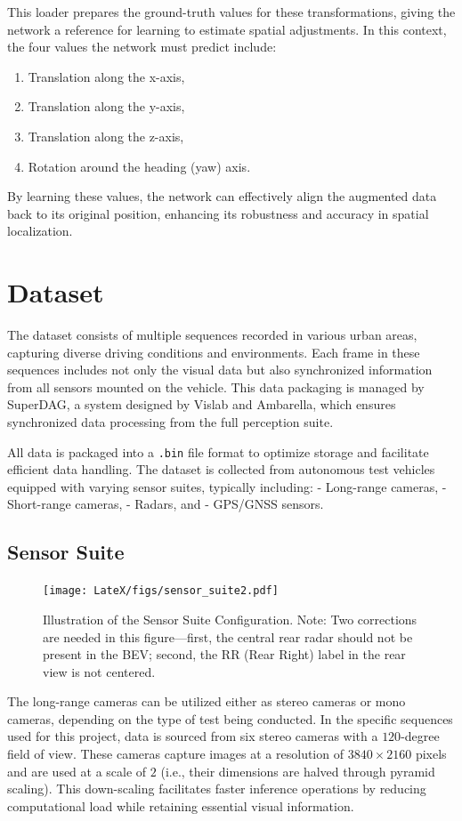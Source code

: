 This loader prepares the ground-truth values for these transformations, giving the network a reference for learning to estimate spatial adjustments. In this context, the four values the network must predict include:
\begin{enumerate}
    \item Translation along the x-axis,
    \item Translation along the y-axis,
    \item Translation along the z-axis, 
    \item Rotation around the heading (yaw) axis.
\end{enumerate}
By learning these values, the network can effectively align the augmented data back to its original position, enhancing its robustness and accuracy in spatial localization.

\section{Dataset}
The dataset consists of multiple sequences recorded in various urban areas, capturing diverse driving conditions and environments. Each frame in these sequences includes not only the visual data but also synchronized information from all sensors mounted on the vehicle. This data packaging is managed by SuperDAG, a system designed by Vislab and Ambarella, which ensures synchronized data processing from the full perception suite.

All data is packaged into a \texttt{.bin} file format to optimize storage and facilitate efficient data handling. The dataset is collected from autonomous test vehicles equipped with varying sensor suites, typically including:
- Long-range cameras,
- Short-range cameras,
- Radars, and
- GPS/GNSS sensors.
\subsection{Sensor Suite}

\begin{figure}
    \centering
    \texttt{[image: LateX/figs/sensor\_suite2.pdf]}
    \caption{Illustration of the Sensor Suite Configuration. Note: Two corrections are needed in this figure—first, the central rear radar should not be present in the BEV; second, the RR (Rear Right) label in the rear view is not centered.}
    \label{fig:sensor-suite}
\end{figure}

The long-range cameras can be utilized either as stereo cameras or mono cameras, depending on the type of test being conducted. In the specific sequences used for this project, data is sourced from six stereo cameras with a $120$-degree field of view. These cameras capture images at a resolution of $3840 \times 2160$ pixels and are used at a scale of $2$ (i.e., their dimensions are halved through pyramid scaling). This down-scaling facilitates faster inference operations by reducing computational load while retaining essential visual information.


